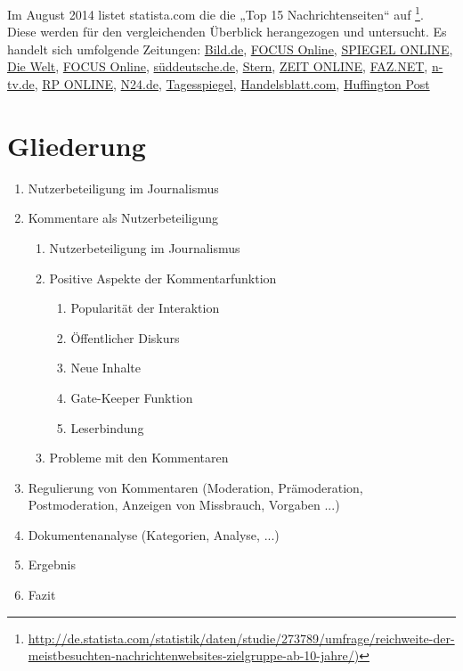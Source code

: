\documentclass[12pt,titlepage=no,parskip=full]{scrartcl} %
\begin{document}
Im August 2014 listet statista.com die die „Top 15 Nachrichtenseiten“ auf
\footnote{\url{http://de.statista.com/statistik/daten/studie/273789/umfrage/reichweite-der-meistbesuchten-nachrichtenwebsites-zielgruppe-ab-10-jahre/)}}.
Diese werden für den vergleichenden Überblick herangezogen und untersucht. Es
handelt sich umfolgende Zeitungen:
 \href{http://www.Bild.de}{Bild.de}, 
 \href{http://www.focus.de}{FOCUS Online}, 
 \href{http://www.spiegel.de}{SPIEGEL ONLINE}, 
 \href{http://www.welt.de}{Die Welt}, 
 \href{http://www.focus.de}{FOCUS Online}, 
 \href{http://www.süddeutsche.de}{süddeutsche.de}, 
 \href{http://www.stern.de}{Stern},   
 \href{http://www.zeit.de}{ZEIT ONLINE}, 
 \href{http://www.FAZ.NET}{FAZ.NET}, 
 \href{http://www.n-tv.de}{n-tv.de},  
 \href{http://www.rp-online.de}{RP ONLINE}, 
 \href{http://www.N24.de}{N24.de},  
 \href{http://www.tagesspiegel.de}{Tagesspiegel}, 
 \href{http://www.Handelsblatt.com}{Handelsblatt.com}, 
\href{http://www.Huffingtonpost.de}{Huffington Post}





\section{Gliederung}

\renewcommand{\labelenumii}{\arabic{enumi}.\arabic{enumii}}
\renewcommand{\labelenumiii}{\arabic{enumi}.\arabic{enumii}.\arabic{enumiii}}
\renewcommand{\labelenumiv}{\arabic{enumi}.\arabic{enumii}.\arabic{enumiii}.\arabic{enumiv}}
\begin{enumerate}
  \item Nutzerbeteiligung im Journalismus
  \item Kommentare als Nutzerbeteiligung
  \begin{enumerate}
    \item Nutzerbeteiligung im Journalismus
    \item Positive Aspekte der Kommentarfunktion
    \begin{enumerate}
      \item Popularität der Interaktion
      \item Öffentlicher Diskurs
      \item Neue Inhalte
      \item Gate-Keeper Funktion
      \item Leserbindung
    \end{enumerate}
    \item Probleme mit den Kommentaren
  \end{enumerate}
  \item Regulierung von Kommentaren (Moderation, Prämoderation, Postmoderation, Anzeigen von Missbrauch, Vorgaben ...)
  \item Dokumentenanalyse (Kategorien, Analyse, ...)
  \item Ergebnis
  \item Fazit
\end{enumerate}
\end{document}
